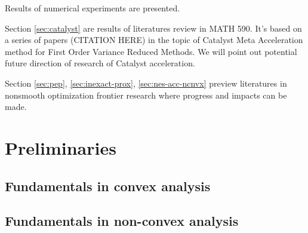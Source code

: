 \documentclass[12pt]{article}
\begin{document}
    Results of numerical experiments are presented. 
    \par
    Section \ref{sec:catalyst} are results of literatures review in MATH 590. 
    It's based on a series of papers (CITATION HERE) in the topic of Catalyst Meta Acceleration method for First Order Variance Reduced Methods. 
    We will point out potential future direction of research of Catalyst acceleration. 
    \par
    Section \ref{sec:pep}, \ref{sec:inexact-prox}, \ref{sec:nes-acc-ncnvx} preview literatures in  nonsmooth optimization frontier research where progress and impacts can be made.  





    
\section{Preliminaries}
    \subsection{Fundamentals in convex analysis}
    \subsection{Fundamentals in non-convex analysis}
\end{document}
